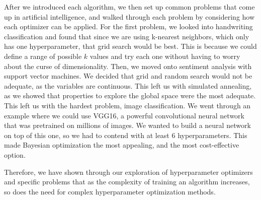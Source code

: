 \documentclass[stu,12pt,floatsintext]{apa7}
\begin{document}
After we introduced each algorithm, we then set up common problems that come up in artificial intelligence, and walked through each problem by considering how each optimizer can be applied. For the first problem, we looked into handwriting classification and found that since we are using k-nearest neighbors, which only has one hyperparameter, that grid search would be best. This is because we could define a range of possible \(k\) values and try each one without having to worry about the curse of dimensionality. Then, we moved onto sentiment analysis with support vector machines. We decided that grid and random search would not be adequate, as the variables are continuous. This left us with simulated annealing, as we showed that properties to explore the global space were the most adequate. This left us with the hardest problem, image classification. We went through an example where we could use VGG16, a powerful convolutional neural network that was pretrained on millions of images. We wanted to build a neural network on top of this one, so we had to contend with at least 6 hyperparameters. This made Bayesian optimization the most appealing, and the most cost-effective option. 

Therefore, we have shown through our exploration of hyperparameter optimizers and specific problems that as the complexity of training an algorithm increases, so does the need for complex hyperparameter optimization methods.

\printbibliography
\end{document}
